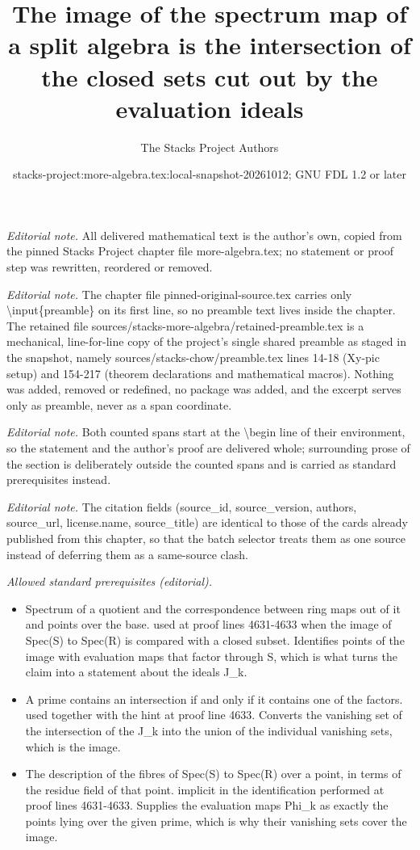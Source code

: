 \documentclass[10pt,a4paper]{amsart}
\title{The image of the spectrum map of a split algebra is the intersection of the closed sets cut out by the evaluation ideals}
\author{The Stacks Project Authors}
\date{stacks-project:more-algebra.tex:local-snapshot-20261012; GNU FDL 1.2 or later}
\theoremstyle{plain}
\theoremstyle{definition}
\theoremstyle{remark}
\numberwithin{equation}{subsection}
\begin{document}
\maketitle
\setcounter{subsection}{1}
\noindent\textit{Editorial note.} All delivered mathematical text is the author's own, copied from the pinned Stacks Project chapter file more-algebra.tex; no statement or proof step was rewritten, reordered or removed.\par\medskip
\noindent\textit{Editorial note.} The chapter file pinned-original-source.tex carries only \textbackslash{}input\{preamble\} on its first line, so no preamble text lives inside the chapter. The retained file sources/stacks-more-algebra/retained-preamble.tex is a mechanical, line-for-line copy of the project's single shared preamble as staged in the snapshot, namely sources/stacks-chow/preamble.tex lines 14-18 (Xy-pic setup) and 154-217 (theorem declarations and mathematical macros). Nothing was added, removed or redefined, no package was added, and the excerpt serves only as preamble, never as a span coordinate.\par\medskip
\noindent\textit{Editorial note.} Both counted spans start at the \textbackslash{}begin line of their environment, so the statement and the author's proof are delivered whole; surrounding prose of the section is deliberately outside the counted spans and is carried as standard prerequisites instead.\par\medskip
\noindent\textit{Editorial note.} The citation fields (source\_id, source\_version, authors, source\_url, license.name, source\_title) are identical to those of the cards already published from this chapter, so that the batch selector treats them as one source instead of deferring them as a same-source clash.\par\medskip
\noindent\textit{Allowed standard prerequisites (editorial).}\begin{itemize}
\item Spectrum of a quotient and the correspondence between ring maps out of it and points over the base. used at proof lines 4631-4633 when the image of Spec(S) to Spec(R) is compared with a closed subset. Identifies points of the image with evaluation maps that factor through S, which is what turns the claim into a statement about the ideals J\_k.
\item A prime contains an intersection if and only if it contains one of the factors. used together with the hint at proof line 4633. Converts the vanishing set of the intersection of the J\_k into the union of the individual vanishing sets, which is the image.
\item The description of the fibres of Spec(S) to Spec(R) over a point, in terms of the residue field of that point. implicit in the identification performed at proof lines 4631-4633. Supplies the evaluation maps Phi\_k as exactly the points lying over the given prime, which is why their vanishing sets cover the image.
\end{itemize}\medskip
\end{document}
